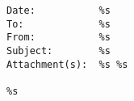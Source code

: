 \documentclass{report}
\begin{document}
\setlength{\parindent}{0pt}

\lstset{breaklines=true,basicstyle=\ttfamily}
\begin{lstlisting}
Date:           %s
To:             %s
From:           %s
Subject:        %s
Attachment(s):  %s %s

%s
\end{lstlisting}
\end{document}
